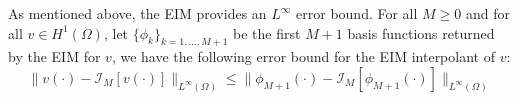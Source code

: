 As mentioned above, the EIM provides an $L^\infty$ error bound.
% 
% 
%  
% 
%  
%  
 For all $M \geq 0 $ and for all $v \in H^1 ( \Omega)$, let $\{ \phi_k \}_{k = 1,\dots,M+1}$ be
 the first $M+1$ basis functions returned by the EIM for $v$, we have the following error bound 
 for  the EIM interpolant of $v$:
% 
%  
% 
%  
%  
% 
%   
   \begin{equation}
   \label{eq:EIM_bound}
  \| v(\cdot) - \mathcal{I}_M [v(\cdot)] \|_{L^\infty(\Omega)} \leq  \| \phi_{M+1}(\cdot) - \mathcal{I}_{M} [\phi_{M+1}(\cdot)] \|_{L^\infty(\Omega)}
  \end{equation} 
%   
%   


